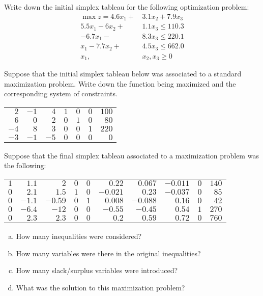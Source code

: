 \documentclass[11pt,letterpaper]{article}
\begin{document}

 Write down the initial simplex tableau for the following optimization problem:
	\[
	\begin{aligned}
	\max z= 4.6x_1 + \,&3.1x_2 + 7.9x_3 \\
	5.5x_1 - 6x_2 + \,&1.1x_3 \leq 110.3 \\
	-6.7x_1 - \,&8.3 x_3 \leq 220.1 \\
	x_1 - 7.7x_2 + \,&4.5x_3 \leq 662.0 \\
	x_1, \, &x_2, x_3 \geq 0 
	\end{aligned}
	\]



\newpage



 Suppose that the initial simplex tableau below was associated to a standard maximization problem. Write down the function being maximized and the corresponding system of constraints. \par
	\begin{table}[!ht]
	\centering
	\begin{tabular}{rrrrrr|r}
	$2$ & $-1$ & $4$ & $1$ & $0$ & $0$ & $100$ \\
	$6$ & $0$ & $2$ & $0$ & $1$ & $0$ & $80$ \\
	$-4$ & $8$ & $3$ & $0$ & $0$ & $1$ & $220$ \\ \hline
	$-3$ & $-1$ & $-5$ & $0$ & $0$ & $0$ & $0$ \\
	\end{tabular}
	\end{table}



\newpage



 Suppose that the final simplex tableau associated to a maximization problem was the following: \par
	\begin{table}[!ht]
	\centering
	\begin{tabular}{rrrrrrrrrr}
	$1$ & $1.1$ & $2$ & $0$ & $0$ & $0.22$ & $0.067$ & $-0.011$ & $0$ & $140$ \\
	$0$ & $2.1$ & $1.5$ & $1$ & $0$ & $-0.021$ & $0.23$ & $-0.037$ & $0$ & $85$ \\
	$0$ & $-1.1$ & $-0.59$ & $0$ & $1$ & $0.008$ & $-0.088$ & $0.16$ & $0$ & $42$ \\
	$0$ & $-6.4$ & $-12$ & $0$ & $0$ & $-0.55$ & $-0.45$ & $0.54$ & $1$ & $270$ \\
	$0$ & $2.3$ & $2.3$ & $0$ & $0$ & $0.2$ & $0.59$ & $0.72$ & $0$ & $760$ \\
	\end{tabular}
	\end{table}

\begin{enumerate}[(a)]
\item How many inequalities were considered?
\item How many variables were there in the original inequalities?
\item How many slack/surplus variables were introduced?
\item What was the solution to this maximization problem?
\end{enumerate}
\end{document}
